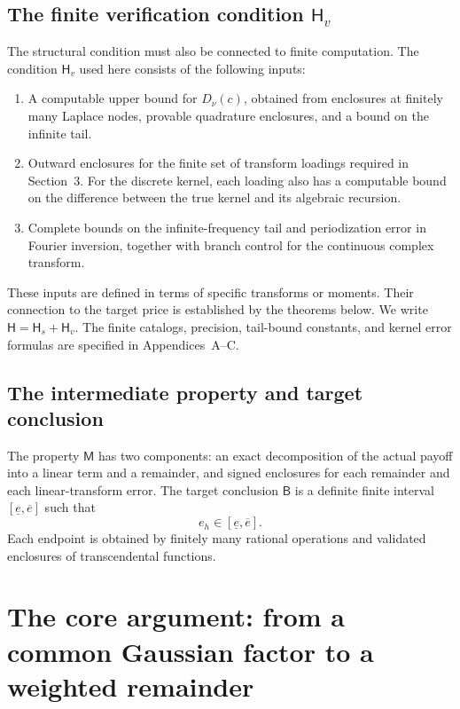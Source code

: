 \documentclass[11pt,a4paper]{article}
\begin{document}
\subsection{The finite verification condition \(\mathsf H_v\)}

The structural condition must also be connected to finite computation. The condition \(\mathsf H_v\) used here consists of the following inputs:
\begin{enumerate}
\item A computable upper bound for \(D_\nu(c)\), obtained from enclosures at finitely many Laplace nodes, provable quadrature enclosures, and a bound on the infinite tail.
\item Outward enclosures for the finite set of transform loadings required in Section~3. For the discrete kernel, each loading also has a computable bound on the difference between the true kernel and its algebraic recursion.
\item Complete bounds on the infinite-frequency tail and periodization error in Fourier inversion, together with branch control for the continuous complex transform.
\end{enumerate}
These inputs are defined in terms of specific transforms or moments. Their connection to the target price is established by the theorems below. We write
\(\mathsf H=\mathsf H_s+\mathsf H_v\).
The finite catalogs, precision, tail-bound constants, and kernel error formulas are specified in Appendices~A--C.

\subsection{The intermediate property and target conclusion}

The property \(\mathsf M\) has two components: an exact decomposition of the actual payoff into a linear term and a remainder, and signed enclosures for each remainder and each linear-transform error. The target conclusion \(\mathsf B\) is a definite finite interval \([\underline e,\overline e]\) such that
\[
e_h\in[\underline e,\overline e].
\tag{2.8}
\]
Each endpoint is obtained by finitely many rational operations and validated enclosures of transcendental functions.

\section{The core argument: from a common Gaussian factor to a weighted remainder}
\end{document}
